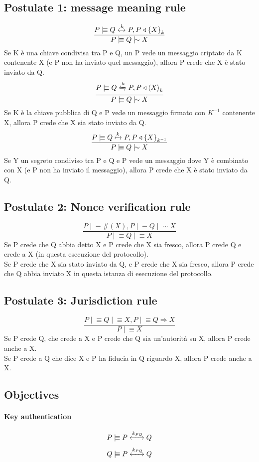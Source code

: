 \documentclass[a4paper,12pt]{article}
\newcommand{\believes}{\mid\!\equiv}
\newcommand{\sees}{\triangleleft}
\newcommand{\oncesaid}{\mid\!\sim}
\newcommand{\controls}{\Rightarrow}
\newcommand{\fresh}[1]{\#(#1)}
\newcommand{\combine}[2]{{\langle #1 \rangle}_{#2}}
\newcommand{\encrypt}[2]{{ \{ #1 \} }_{#2}}
\newcommand{\sharekey}[1]{\xleftrightarrow{#1}}
\newcommand{\pubkey}[1]{\xmapsto{#1}}
\newcommand{\secret}[1]{\xleftrightharpoons{#1}}
\begin{document}
\subsection{Postulate 1: message meaning rule}
\[\frac{P \believes Q \sharekey{k} P, P \sees \encrypt{X}{k}}{P \believes Q \oncesaid X}\]
Se K è una chiave condivisa tra P e Q, un P vede un messaggio criptato da K contenente X (e P non ha inviato quel messaggio), allora P crede che X è stato inviato da Q.
\[\frac{P \believes Q \secret{k} P, P \sees \combine{X}{k}}{P \believes Q \oncesaid X}\]
Se K è la chiave pubblica di Q e P vede un messaggio firmato con $K^{-1}$ contenente X, allora P crede che X sia stato inviato da Q.
\[\frac{P \believes Q \pubkey{k} P, P \sees \encrypt{X}{k^{-1}}}{P \believes Q \oncesaid X}\]
Se Y un segreto condiviso tra P e Q e P vede un messaggio dove Y è combinato con X (e P non ha inviato il messaggio), allora P crede che X è stato inviato da Q.

\subsection{Postulate 2: Nonce verification rule}
\[\frac{P \believes \fresh{X}, P \believes Q \oncesaid X}{P \believes Q \believes X}\]
Se P crede che Q abbia detto X e P crede che X sia fresco, allora P crede Q e crede a X (in questa esecuzione del protocollo). \\
Se P crede che X sia stato inviato da Q, e P crede che X sia fresco, allora P crede che Q abbia inviato X in questa istanza di esecuzione del protocollo.

\subsection{Postulate 3: Jurisdiction rule}
\[\frac{P \believes Q \believes X, P \believes Q \controls X}{P \believes X}\]
Se P crede Q, che crede a X e P crede che Q sia un'autorità su X, allora P crede anche a X. \\
Se P crede a Q che dice X e P ha fiducia in Q riguardo X, allora P crede anche a X.

\subsection{Objectives}
\paragraph{Key authentication}
\[P \believes P \sharekey{k_{PQ}} Q\]
\[Q \believes P \sharekey{k_{PQ}} Q\]
\end{document}
